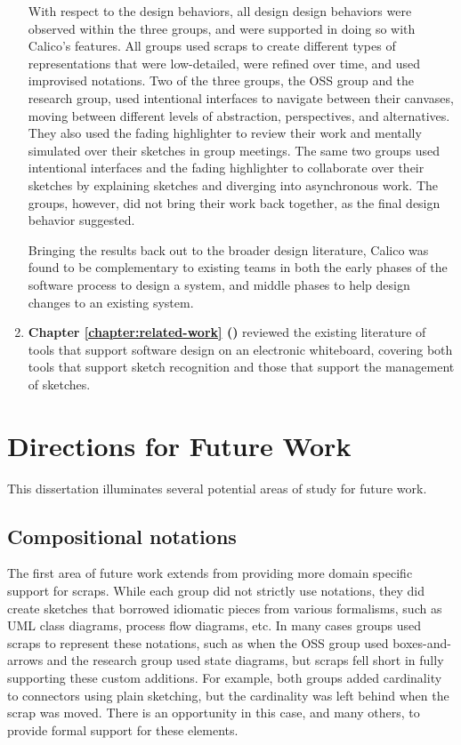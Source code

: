 \begin{enumerate}
   With respect to the design behaviors, all design design behaviors were observed within the three groups, and were supported in doing so with Calico's features. All groups used scraps to create different types of representations that were low-detailed, were refined over time, and used improvised notations. Two of the three groups, the OSS group and the research group, used intentional interfaces to navigate between their canvases, moving between different levels of abstraction, perspectives, and alternatives. They also used the fading highlighter to review their work and mentally simulated over their sketches in group meetings. The same two groups used intentional interfaces and the fading highlighter to collaborate over their sketches by explaining sketches and diverging into asynchronous work. The groups, however, did not bring their work back together, as the final design behavior suggested.
   
   Bringing the results back out to the  broader design literature, Calico was found to be complementary to existing teams in both the early phases of the software process to design a system, and middle phases to help design changes to an existing system.  

   \item \textbf{Chapter \ref{chapter:related-work} ()} reviewed the existing literature of tools that support software design on an electronic whiteboard, covering both tools that support sketch recognition and those that support the management of sketches.
 \end{enumerate}

\section{Directions for Future Work}
This dissertation illuminates several potential areas of study for future work. 

\subsection{Compositional notations}

The first area of future work extends from providing more domain specific support for scraps. While each group did not strictly use notations, they did create sketches that borrowed idiomatic pieces from various formalisms, such as UML class diagrams, process flow diagrams, etc. In many cases groups used scraps to represent these notations, such as when the OSS group used boxes-and-arrows and the research group used state diagrams, but scraps fell short in fully supporting these custom additions. For example, both groups added cardinality to connectors using plain sketching, but the cardinality was left behind when the scrap was moved. There is an opportunity in this case, and many others, to provide formal support for these elements. 

